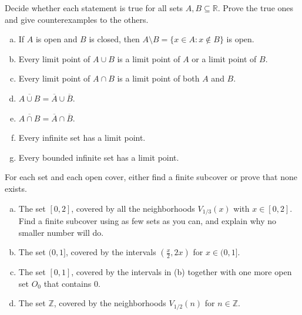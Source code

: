 \begin{problem}
Decide whether each statement is true for all sets $A, B \subseteq \mathbb{R}$.  Prove the true ones and give counterexamples to the others.
\begin{enumerate}[(a)]
	\item If $A$ is open and $B$ is closed, then $A \setminus B = \{x \in A : x \notin B\}$ is open.
	\item Every limit point of $A \cup B$ is a limit point of $A$ or a limit point of $B$.
	\item Every limit point of $A \cap B$ is a limit point of both $A$ and $B$.
	\item $\overline{A \cup B} = \overline{A} \cup \overline{B}$.
	\item $\overline{A \cap B} = \overline{A} \cap \overline{B}$.
	\item Every infinite set has a limit point.
	\item Every bounded infinite set has a limit point.
\end{enumerate}
\end{problem}

\begin{problem}
For each set and each open cover, either find a finite subcover or prove that none exists.
\begin{enumerate}[(a)]
	\item The set $[0,2]$, covered by all the neighborhoods $V_{1/3}(x)$ with $x \in [0,2]$.  Find a finite subcover using as few sets as you can, and explain why no smaller number will do.
	\item The set $(0,1]$, covered by the intervals $\left(\frac{x}{2}, 2x\right)$ for $x \in (0,1]$.
	\item The set $[0,1]$, covered by the intervals in (b) together with one more open set $O_0$ that contains $0$.
	\item The set $\mathbb{Z}$, covered by the neighborhoods $V_{1/2}(n)$ for $n \in \mathbb{Z}$.
\end{enumerate}
\end{problem}


